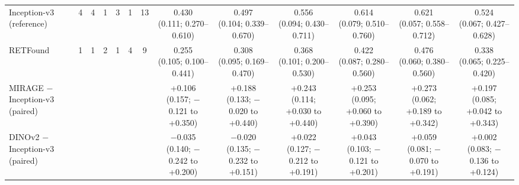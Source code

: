 \begin{tabular}{@{}l*{6}{c}*{6}{c}@{}}
Inception-v3 (reference) & 4 & 4 & 1 & 3 & 1 & 13 & \makecell{0.430\\{\scriptsize (0.111; 0.270--0.610)}} & \makecell{0.497\\{\scriptsize (0.104; 0.339--0.670)}} & \makecell{0.556\\{\scriptsize (0.094; 0.430--0.711)}} & \makecell{0.614\\{\scriptsize (0.079; 0.510--0.760)}} & \makecell{0.621\\{\scriptsize (0.057; 0.558--0.712)}} & \makecell{0.524\\{\scriptsize (0.067; 0.427--0.628)}} \\
RETFound & 1 & 1 & 2 & 1 & 4 & 9 & \makecell{0.255\\{\scriptsize (0.105; 0.100--0.441)}} & \makecell{0.308\\{\scriptsize (0.095; 0.169--0.470)}} & \makecell{0.368\\{\scriptsize (0.101; 0.200--0.530)}} & \makecell{0.422\\{\scriptsize (0.087; 0.280--0.560)}} & \makecell{0.476\\{\scriptsize (0.060; 0.380--0.560)}} & \makecell{0.338\\{\scriptsize (0.065; 0.225--0.420)}} \\
\midrule
\makecell[l]{MIRAGE $-$\\Inception-v3 (paired)} & \multicolumn{6}{c}{} & \makecell{+0.106\\{\scriptsize (0.157; $-$0.121 to +0.350)}} & \makecell{+0.188\\{\scriptsize (0.133; $-$0.020 to +0.440)}} & \makecell{+0.243\\{\scriptsize (0.114; +0.030 to +0.440)}} & \makecell{+0.253\\{\scriptsize (0.095; +0.060 to +0.390)}} & \makecell{+0.273\\{\scriptsize (0.062; +0.189 to +0.342)}} & \makecell{+0.197\\{\scriptsize (0.085; +0.042 to +0.343)}} \\
\makecell[l]{DINOv2 $-$\\Inception-v3 (paired)} & \multicolumn{6}{c}{} & \makecell{$-$0.035\\{\scriptsize (0.140; $-$0.242 to +0.200)}} & \makecell{$-$0.020\\{\scriptsize (0.135; $-$0.232 to +0.151)}} & \makecell{+0.022\\{\scriptsize (0.127; $-$0.212 to +0.191)}} & \makecell{+0.043\\{\scriptsize (0.103; $-$0.121 to +0.201)}} & \makecell{+0.059\\{\scriptsize (0.081; $-$0.070 to +0.191)}} & \makecell{+0.002\\{\scriptsize (0.083; $-$0.136 to +0.124)}} \\

\end{tabular}
